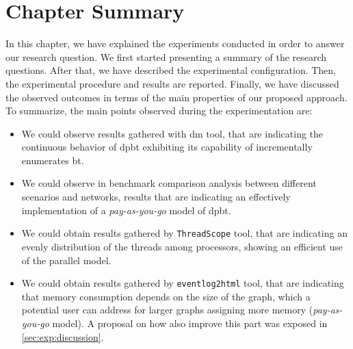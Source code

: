 \section{Chapter Summary}
In this chapter, we have explained the experiments conducted in order to answer our research question.
We first started presenting a summary of the research questions. After that, we have described the experimental configuration.
Then, the experimental procedure and results are reported. Finally, we have discussed the observed outcomes in terms of the main properties of our proposed approach.
To summarize, the main points observed during the experimentation are:
\begin{itemize}
  \item We could observe results gathered with \acrshort{dm} tool, that are indicating the continuous behavior of \acrshort{dpbt} exhibiting its capability of incrementally enumerates \acrshort{bt}.
  \item We could observe in benchmark comparison analysis between different scenarios and networks, results that are indicating an effectively implementation of a \emph{pay-as-you-go} model of \acrshort{dpbt}.
  \item We could obtain results gathered by \texttt{ThreadScope} tool, that are indicating an evenly distribution of the threads among processors, showing an efficient use of the parallel model.
  \item We could obtain results gathered by \texttt{eventlog2html} tool, that are indicating that memory consumption depends on the size of the graph, which a potential user can address for larger graphs assigning more memory (\emph{pay-as-you-go} model). A proposal on how also improve this part was exposed in \autoref{sec:exp:discussion}.
\end{itemize} 
